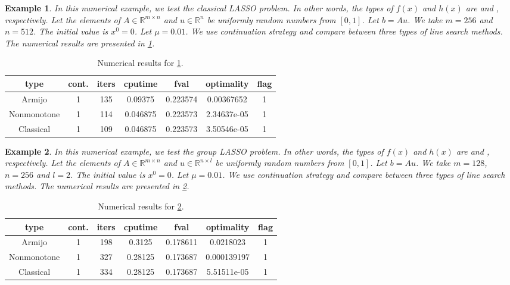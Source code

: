 \documentclass[a4paper]{article}
\newtheorem{example}{Example}
\newcommand{\mr}{\mathbb{R}}
\newcommand{\co}[1]{{\con{#1}}}
\begin{document}
  
  
  
  \begin{example}\label{exp1}
    In this numerical example, we test the classical LASSO problem.
    In other words, the types of $f(x)$ and $h(x)$ are \co{LS} and 
    \co{L1\_NORM}, respectively. Let the elements of $A \in \mr^{m 
    \times n}$ and $u \in \mr^n$ be uniformly random numbers from 
    $[0,1]$. Let $b = Au$. We take $m = 256$ and $n = 512$. The 
    initial value is $x^0 = 0$. Let $\mu = 0.01$. We use continuation 
    strategy and compare between three 
    types of line search methods. The numerical results are presented 
    in \cref{tab1}.
  \end{example}
  
  \begin{table}[p]
    \centering
    \begin{tabular}{cc|ccccc}
      \hline
      type & cont. & iters & cputime & 
      fval & optimality & flag \\ \hline
      Armijo & 1 & 135 & 0.09375 & 0.223574 & 0.00367652 & 1 \\
      Nonmonotone & 1 & 114 & 0.046875 & 0.223573 & 2.34637e-05 & 1 \\
      Classical & 1 & 109 & 0.046875 & 0.223573 & 3.50546e-05 & 1 \\
      \hline
    \end{tabular}
    \caption{Numerical results for \cref{exp1}.}
    \label{tab1}
  \end{table}

  \begin{example}\label{exp2}
    In this numerical example, we test the group LASSO problem.
    In other words, the types of $f(x)$ and $h(x)$ are \co{LS} and 
    \co{L12\_NORM}, respectively. Let the elements of $A \in \mr^{m 
    \times n}$ and $u \in \mr^{n \times l}$ be uniformly random 
    numbers from $[0,1]$. Let $b = Au$. We take $m = 128$, $n = 256$ 
    and $l = 2$. The initial value is $x^0 = 0$. Let $\mu = 0.01$. We 
    use continuation strategy and compare between three 
    types of line search methods. The numerical results are presented 
    in \cref{tab2}.
  \end{example}
  
  \begin{table}[p]
    \centering
    \begin{tabular}{cc|ccccc}
      \hline
      type & cont. & iters & cputime & 
      fval & optimality & flag \\ \hline
      Armijo & 1 & 198 & 0.3125 & 0.178611 & 0.0218023 & 1 \\
      Nonmonotone & 1 & 327 & 0.28125 & 0.173687 & 0.000139197 & 1 \\
      Classical & 1 & 334 & 0.28125 & 0.173687 & 5.51511e-05 & 1 \\
      \hline
    \end{tabular}
    \caption{Numerical results for \cref{exp2}.}
    \label{tab2}
  \end{table}
\end{document}
